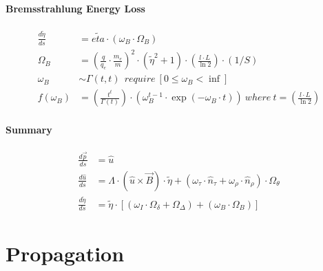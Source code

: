 \documentclass[review]{elsarticle}
\begin{document}
\paragraph{Bremsstrahlung Energy Loss}
\begin{equation} \begin{alignedat}{-1}
    \frac{d\tilde{\eta}}{ds}&=\tilde{eta}\cdot\left(\omega_{B}\cdot\Omega_{B}\right) \\
    \Omega_{B}&={\left(\frac{q}{q_{e}}\cdot\frac{m_{e}}{m}\right)}^{2}\cdot(\tilde{\eta}^{2}+1)\cdot\left(\frac{l\cdot L}{\ln{2}}\right)\cdot(1/S) \\
    \omega_{B}&\sim\Gamma\left(t,t\right)\ \ require\ \left[0\leq\omega_{B}<\inf\right] \\ 
    f\left(\omega_{B}\right)&=\left(\frac{t^t}{\Gamma\left(t\right)}\right)\cdot\left(\omega_{B}^{t-1}\cdot\exp{\left(-\omega_{B}\cdot t\right)}\right)\ where\ t=\left(\frac{l\cdot L}{\ln{2}}\right)
\end{alignedat} \end{equation} 

\paragraph{Summary}
\begin{equation} \begin{alignedat}{-1}
    \frac{d\vec{p}}{ds}&=\hat{u} \\
    \frac{d\hat{u}}{ds}&=\Lambda\cdot(\hat{u}\times\vec{B})\cdot\tilde{\eta}+(\omega_{\tau}\cdot\hat{n}_{\tau}+\omega_{\rho}\cdot\hat{n}_{\rho})\cdot\Omega_{\theta} \\
    \frac{d\tilde{\eta}}{ds}&=\tilde{\eta}\cdot\left[\left(\omega_{I}\cdot\Omega_{\delta}+\Omega_{\Delta}\right)+\left(\omega_{B}\cdot\Omega_{B}\right)\right]
\end{alignedat} \end{equation} 

\section{Propagation}
\end{document}
